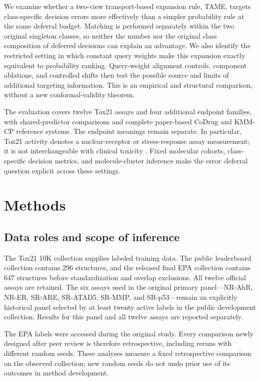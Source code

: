 \documentclass[11pt]{article}
\begin{document}
We examine whether a two-view transport-based expansion rule, TAME, targets class-specific decision errors more effectively than a simpler probability rule at the same deferral budget. Matching is performed separately within the two original singleton classes, so neither the number nor the original class composition of deferred decisions can explain an advantage. We also identify the restricted setting in which constant query weights make this expansion exactly equivalent to probability ranking. Query-weight alignment controls, component ablations, and controlled shifts then test the possible source and limits of additional targeting information. This is an empirical and structural comparison, without a new conformal-validity theorem.

The evaluation covers twelve Tox21 assays and four additional endpoint families, with shared-predictor comparisons and complete paper-based CoDrug and KMM-CP reference systems. The endpoint meanings remain separate. In particular, Tox21 activity denotes a nuclear-receptor or stress-response assay measurement; it is not interchangeable with clinical toxicity \citep{huang2016}. Fixed molecular cohorts, class-specific decision metrics, and molecule-cluster inference make the error--deferral question explicit across these settings.

\section{Methods}
\subsection{Data roles and scope of inference}
The Tox21 10K collection supplies labeled training data. The public leaderboard collection contains 296 structures, and the released final EPA collection contains 647 structures before standardization and overlap exclusions. All twelve official assays are retained. The six assays used in the original primary panel---NR-AhR, NR-ER, SR-ARE, SR-ATAD5, SR-MMP, and SR-p53---remain an explicitly historical panel selected by at least twenty active labels in the public development collection. Results for this panel and all twelve assays are reported separately.

The EPA labels were accessed during the original study. Every comparison newly designed after peer review is therefore retrospective, including reruns with different random seeds. These analyses measure a fixed retrospective comparison on the observed collection; new random seeds do not undo prior use of its outcomes in method development.
\end{document}
